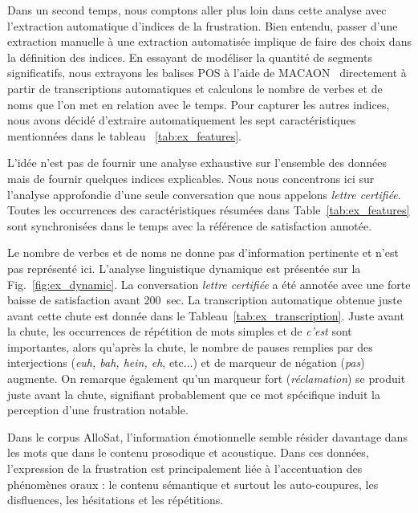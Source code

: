Dans un second temps, nous comptons aller plus loin dans cette analyse avec l'extraction automatique d'indices de la frustration.
Bien entendu, passer d'une extraction manuelle à une extraction automatisée implique de faire des choix dans la définition des indices.
En essayant de modéliser la quantité de segments significatifs, nous extrayons les balises POS à l'aide de MACAON~\cite{Nasr2011} directement à partir de transcriptions automatiques et calculons le nombre de verbes et de noms que l'on met en relation avec le temps.
Pour capturer les autres indices, nous avons décidé d'extraire automatiquement les sept caractéristiques mentionnées dans le tableau ~\ref{tab:ex_features}.



L'idée n'est pas de fournir une analyse exhaustive sur l'ensemble des données mais de fournir quelques indices explicables. Nous nous concentrons ici sur l'analyse approfondie d'une seule conversation que nous appelons \textit{lettre certifiée}. Toutes les occurrences des caractéristiques résumées dans Table~\ref{tab:ex_features} sont synchronisées dans le temps avec la référence de satisfaction annotée.



Le nombre de verbes et de noms ne donne pas d'information pertinente et n'est pas représenté ici. L'analyse linguistique dynamique est présentée sur la Fig.~\ref{fig:ex_dynamic}. La conversation \textit{lettre certifiée} a été annotée avec une forte baisse de satisfaction avant 200~sec. La transcription automatique obtenue juste avant cette chute est donnée dans le Tableau~\ref{tab:ex_transcription}. Juste avant la chute, les occurrences de répétition de mots simples et de \textit{c'est} sont importantes, alors qu'après la chute, le nombre de pauses remplies par des interjections (\textit{euh, bah, hein, eh}, etc...) et de marqueur de négation (\textit{pas}) augmente. On remarque également qu'un marqueur fort (\textit{réclamation}) se produit juste avant la chute, signifiant probablement que ce mot spécifique induit la perception d'une frustration notable.



Dans le corpus AlloSat, l'information émotionnelle semble résider davantage dans les mots que dans le contenu prosodique et acoustique. Dans ces données, l'expression de la frustration est principalement liée à l'accentuation des phénomènes oraux : le contenu sémantique et surtout les auto-coupures, les disfluences, les hésitations et les répétitions.


